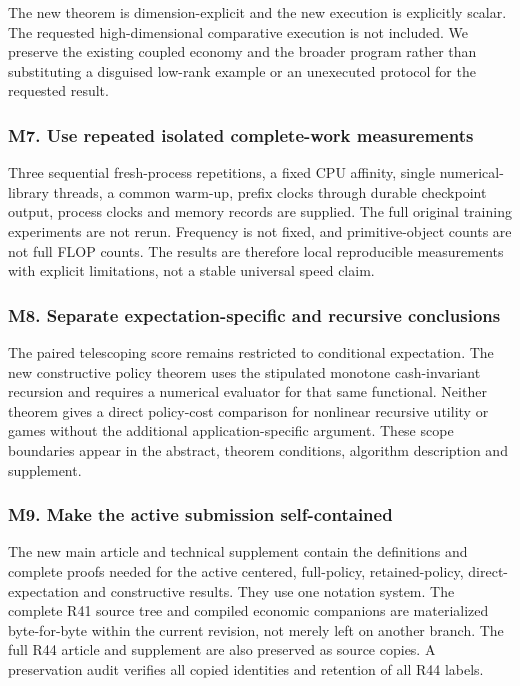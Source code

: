 \documentclass[ecta,nameyear,draft]{econsocart}
\begin{document}
The new theorem is dimension-explicit and the new execution is
explicitly scalar. The requested high-dimensional comparative execution
is not included. We preserve the existing coupled economy and the
broader program rather than substituting a disguised low-rank example or
an unexecuted protocol for the requested result.

\hypertarget{m7-use-repeated-isolated-complete-work-measurements}{%
\subsubsection{M7. Use repeated isolated complete-work
measurements}\label{m7-use-repeated-isolated-complete-work-measurements}}

Three sequential fresh-process repetitions, a fixed CPU affinity, single
numerical-library threads, a common warm-up, prefix clocks through
durable checkpoint output, process clocks and memory records are
supplied. The full original training experiments are not rerun.
Frequency is not fixed, and primitive-object counts are not full FLOP
counts. The results are therefore local reproducible measurements with
explicit limitations, not a stable universal speed claim.

\hypertarget{m8-separate-expectation-specific-and-recursive-conclusions}{%
\subsubsection{M8. Separate expectation-specific and recursive
conclusions}\label{m8-separate-expectation-specific-and-recursive-conclusions}}

The paired telescoping score remains restricted to conditional
expectation. The new constructive policy theorem uses the stipulated
monotone cash-invariant recursion and requires a numerical evaluator for
that same functional. Neither theorem gives a direct policy-cost
comparison for nonlinear recursive utility or games without the
additional application-specific argument. These scope boundaries appear
in the abstract, theorem conditions, algorithm description and
supplement.

\hypertarget{m9-make-the-active-submission-self-contained}{%
\subsubsection{M9. Make the active submission
self-contained}\label{m9-make-the-active-submission-self-contained}}

The new main article and technical supplement contain the definitions
and complete proofs needed for the active centered, full-policy,
retained-policy, direct-expectation and constructive results. They use
one notation system. The complete R41 source tree and compiled economic
companions are materialized byte-for-byte within the current revision,
not merely left on another branch. The full R44 article and supplement
are also preserved as source copies. A preservation audit verifies all
copied identities and retention of all R44 labels.
\end{document}
